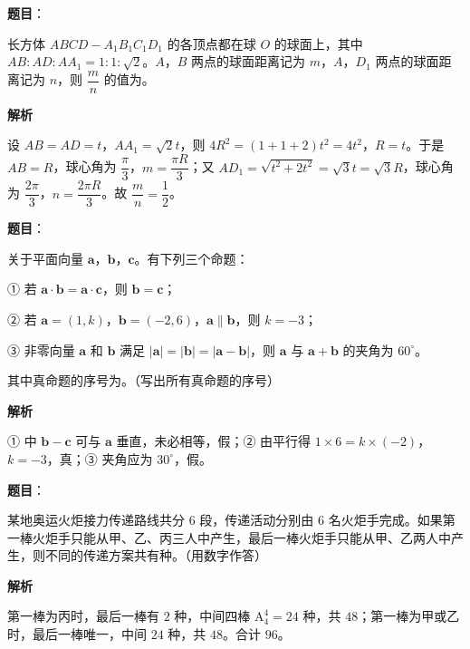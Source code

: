 \begin{answer}

\textbf{题目}：

长方体 $ABCD-A_1B_1C_1D_1$ 的各顶点都在球 $O$ 的球面上，其中 $AB:AD:AA_1=1:1:\sqrt2$。$A$，$B$ 两点的球面距离记为 $m$，$A$，$D_1$ 两点的球面距离记为 $n$，则 $\dfrac mn$ 的值为\gkblank{}。

\textbf{解析}

设 $AB=AD=t$，$AA_1=\sqrt2t$，则 $4R^2=(1+1+2)t^2=4t^2$，$R=t$。于是 $AB=R$，球心角为 $\dfrac{\pi}3$，$m=\dfrac{\pi R}3$；又 $AD_1=\sqrt{t^2+2t^2}=\sqrt3t=\sqrt3R$，球心角为 $\dfrac{2\pi}3$，$n=\dfrac{2\pi R}3$。故 $\dfrac mn=\dfrac12$。


\end{answer}
\begin{answer}

\textbf{题目}：

关于平面向量 $\boldsymbol a$，$\boldsymbol b$，$\boldsymbol c$。有下列三个命题：

① 若 $\boldsymbol a\cdot\boldsymbol b=\boldsymbol a\cdot\boldsymbol c$，则 $\boldsymbol b=\boldsymbol c$；

② 若 $\boldsymbol a=(1,k)$，$\boldsymbol b=(-2,6)$，$\boldsymbol a\parallel\boldsymbol b$，则 $k=-3$；

③ 非零向量 $\boldsymbol a$ 和 $\boldsymbol b$ 满足 $|\boldsymbol a|=|\boldsymbol b|=|\boldsymbol a-\boldsymbol b|$，则 $\boldsymbol a$ 与 $\boldsymbol a+\boldsymbol b$ 的夹角为 $60^\circ$。

其中真命题的序号为\gkblank{}。（写出所有真命题的序号）

\textbf{解析}

① 中 $\boldsymbol b-\boldsymbol c$ 可与 $\boldsymbol a$ 垂直，未必相等，假；② 由平行得 $1\times6=k\times(-2)$，$k=-3$，真；③ 夹角应为 $30^\circ$，假。


\end{answer}
\begin{answer}

\textbf{题目}：

某地奥运火炬接力传递路线共分 $6$ 段，传递活动分别由 $6$ 名火炬手完成。如果第一棒火炬手只能从甲、乙、丙三人中产生，最后一棒火炬手只能从甲、乙两人中产生，则不同的传递方案共有\gkblank{}种。（用数字作答）

\textbf{解析}

第一棒为丙时，最后一棒有 $2$ 种，中间四棒 $\mathrm A_4^4=24$ 种，共 $48$；第一棒为甲或乙时，最后一棒唯一，中间 $24$ 种，共 $48$。合计 $96$。


\end{answer}
